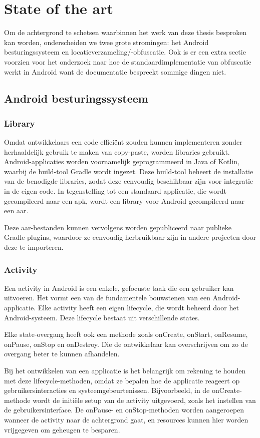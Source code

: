 \chapter{State of the art} \label{chap:state_of_the_art}
Om de achtergrond te schetsen waarbinnen het werk van deze thesis besproken kan worden, onderscheiden we twee grote stromingen: het Android besturingssysteem en locatieverzameling/-obfuscatie. Ook is er een extra sectie voorzien voor het onderzoek naar hoe de standaardimplementatie van obfuscatie werkt in Android want de documentatie bespreekt sommige dingen niet.
\section{Android besturingssysteem}
\subsection{Library}
Omdat ontwikkelaars een code efficiënt zouden kunnen implementeren zonder herhaaldelijk gebruik te maken van copy-paste, worden libraries gebruikt. Android-applicaties worden voornamelijk geprogrammeerd in Java of Kotlin, waarbij de build-tool Gradle wordt ingezet. Deze build-tool beheert de installatie van de benodigde libraries, zodat deze eenvoudig beschikbaar zijn voor integratie in de eigen code.
In tegenstelling tot een standaard applicatie, die wordt gecompileerd naar een \gls{apk}, wordt een library voor Android gecompileerd naar een \gls{aar}.

Deze \gls{aar}-bestanden kunnen vervolgens worden gepubliceerd naar publieke Gradle-plugins, waardoor ze eenvoudig herbruikbaar zijn in andere projecten door deze te importeren.
\subsection{Activity}
Een activity in Android is een enkele, gefocuste taak die een gebruiker kan uitvoeren. Het vormt een van de fundamentele bouwstenen van een Android-applicatie. Elke activity heeft een eigen lifecycle, die wordt beheerd door het Android-systeem. Deze lifecycle bestaat uit verschillende states.

Elke state-overgang heeft ook een methode zoals onCreate, onStart, onResume, onPause, onStop en onDestroy. Die de ontwikkelaar kan overschrijven om zo de overgang beter te kunnen afhandelen.

Bij het ontwikkelen van een applicatie is het belangrijk om rekening te houden met deze lifecycle-methoden, omdat ze bepalen hoe de applicatie reageert op gebruikersinteracties en systeemgebeurtenissen. Bijvoorbeeld, in de onCreate-methode wordt de initiële setup van de activity uitgevoerd, zoals het instellen van de gebruikersinterface. De onPause- en onStop-methoden worden aangeroepen wanneer de activity naar de achtergrond gaat, en resources kunnen hier worden vrijgegeven om geheugen te besparen.

